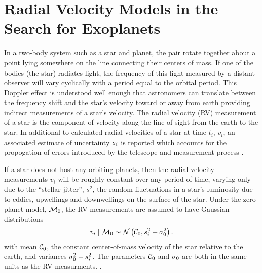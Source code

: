 
\section{Radial Velocity Models in the Search for Exoplanets}
\label{sec:exo}

In a two-body system such as a star and planet, the pair rotate
together about a point lying somewhere on the line connecting their
centers of mass. If one of the bodies (the star) radiates light, the
frequency of this light measured by a distant observer will
 vary  cyclically with a period equal to the orbital period. This
Doppler effect is understood well enough that astronomers can
translate between the frequency shift and the star's velocity toward or
away from earth providing indirect measurements of a star's velocity.
The radial velocity (RV)  measurement of a star is the component of velocity
along the line of sight from the earth to the star.
In additional to calculated radial velocities of a star at
time $t_i$, $v_i$, an associated estimate of uncertainty $s_i$ is
reported which accounts for the propogation of errors introduced
by the telescope and measurement process  .

If a star does not host any orbiting planets, then the radial velocity
measurements $v_i$ will be roughly constant over any period of time,
varying only due to the ``stellar jitter'', $s^2$, the random
fluctuations in a star's luminosity due to eddies, upwellings and downwellings
on the surface of the star. Under the zero-planet
model, ${\cal{M}}_0$, the RV measurements are assumed to  have Gaussian distributions
\begin{equation}\label{0p_Model}
v_i \mid \M_0\ind \mathcal{N}\left(\C_0,\s^2_i + \sj_0^2 \right).
\end{equation}
with mean ${\cal{C}}_0$, the constant center-of-mass velocity of the star
relative to the earth, and variances $\sigma^2_0 + s^2_i$.  The
parameters ${\cal{C}}_0$ and $\sigma_0$ are both in the same units as the RV
measurments. .

